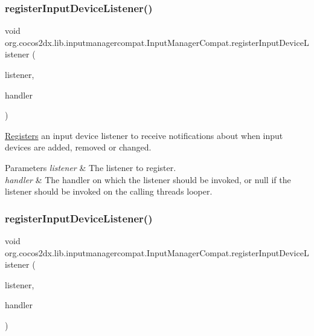 \subsubsection{\texorpdfstring{register\+Input\+Device\+Listener()}{registerInputDeviceListener()}\hspace{0.1cm}{\footnotesize\ttfamily [1/2]}}
{\footnotesize\ttfamily void org.\+cocos2dx.\+lib.\+inputmanagercompat.\+Input\+Manager\+Compat.\+register\+Input\+Device\+Listener (\begin{DoxyParamCaption}\item[{Input\+Manager\+Compat.\+Input\+Device\+Listener}]{listener,  }\item[{Handler}]{handler }\end{DoxyParamCaption})}

\hyperlink{structRegisters}{Registers} an input device listener to receive notifications about when input devices are added, removed or changed.


\begin{DoxyParams}{Parameters}
{\em listener} & The listener to register. \\
\hline
{\em handler} & The handler on which the listener should be invoked, or null if the listener should be invoked on the calling thread\textquotesingle{}s looper. \\
\hline
\end{DoxyParams}
\mbox{\label{interfaceorg_1_1cocos2dx_1_1lib_1_1inputmanagercompat_1_1InputManagerCompat_af505b8f5543cd482c3d3e4b316732a78}} 
\subsubsection{\texorpdfstring{register\+Input\+Device\+Listener()}{registerInputDeviceListener()}\hspace{0.1cm}{\footnotesize\ttfamily [2/2]}}
{\footnotesize\ttfamily void org.\+cocos2dx.\+lib.\+inputmanagercompat.\+Input\+Manager\+Compat.\+register\+Input\+Device\+Listener (\begin{DoxyParamCaption}\item[{Input\+Manager\+Compat.\+Input\+Device\+Listener}]{listener,  }\item[{Handler}]{handler }\end{DoxyParamCaption})}


